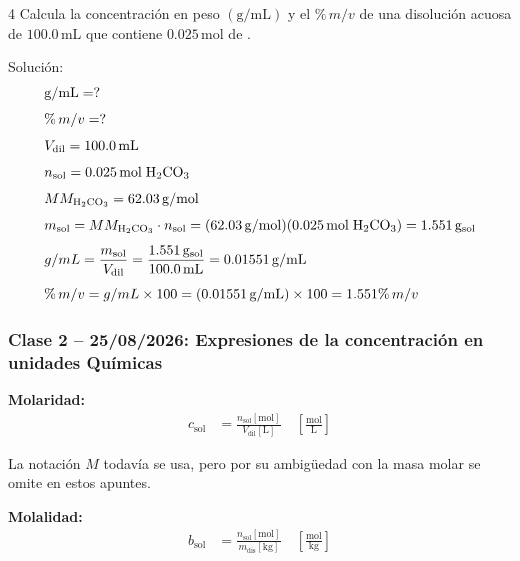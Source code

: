 \begin{exercise}{4}{}
Calcula la concentración en peso $(\mathrm{g/mL})$ y el $\%\,m/v$ de una disolución acuosa de $100.0\,\mathrm{mL}$ que contiene $0.025\,\mathrm{mol}$ de .

Solución:
\begin{align*}
    &\mathrm{g/mL} = ? \\[4pt]
    &\%\,m/v = ? \\[4pt]
    &V_{\mathrm{dil}} = 100.0\,\mathrm{mL} \\[4pt]
    &n_{\mathrm{sol}} = 0.025\,\mathrm{mol}\;\ce{H2CO3} \\[4pt]
    &MM_{\mathrm{H_2CO_3}} = 62.03\,\mathrm{g/mol} \\[4pt]
    &m_{\mathrm{sol}} = MM_{\mathrm{H_2CO_3}} \cdot n_{\mathrm{sol}}
        = (62.03\,\mathrm{g/mol})(0.025\,\mathrm{mol}\;\ce{H2CO3})
        = 1.551\,\mathrm{g}_{\mathrm{sol}} \\[4pt]
    &g/mL = \frac{m_{\mathrm{sol}}}{V_{\mathrm{dil}}}
        = \frac{1.551\,\mathrm{g}_{\mathrm{sol}}}{100.0\,\mathrm{mL}}
        = 0.01551\,\mathrm{g/mL} \\[4pt]
    &\%\,m/v = g/mL \times 100
        = (0.01551\,\mathrm{g/mL}) \times 100
        = 1.551\%\,m/v
\end{align*}
\end{exercise}

{}
\subsubsection*{\textcolor{blueunam}{Clase 2 -- 25/08/2026: Expresiones de la concentración en unidades Químicas}}

\textbf{Molaridad:}
\begin{align*}
    c_{\mathrm{sol}} &= \frac{n_{\mathrm{sol}}[\mathrm{mol}]}{V_{\mathrm{dil}}[\mathrm{L}]}
    \quad \left[\frac{\mathrm{mol}}{\mathrm{L}}\right]
\end{align*}

\begin{notafija}
La notación \(M\) todavía se usa, pero por su ambigüedad con la masa molar se 
omite en estos apuntes.
\end{notafija}

\textbf{Molalidad:}
\begin{align*}
    b_{\mathrm{sol}} &= \frac{n_{\mathrm{sol}}[\mathrm{mol}]}{m_{\mathrm{dis}}[\mathrm{kg}]}
    \quad \left[\frac{\mathrm{mol}}{\mathrm{kg}}\right]
\end{align*}

